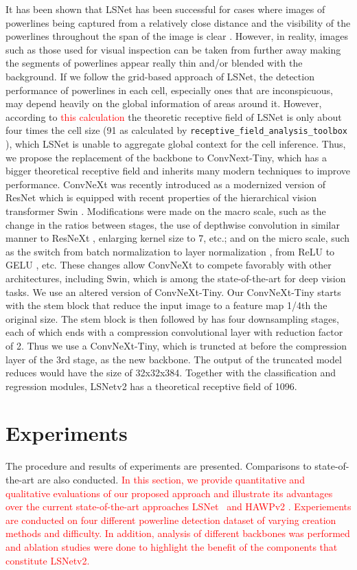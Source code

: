 \documentclass[journal]{IEEEtran}
\begin{document}
It has been shown that LSNet has been successful for cases where images of powerlines being captured from a relatively close distance and the visibility of the powerlines throughout the span of the image is clear \cite{Nguyen2020}. However, in reality, images such as those used for visual inspection can be taken from further away making the segments of powerlines appear really thin and/or blended with the background. If we follow the grid-based approach of LSNet, the detection performance of powerlines in each cell, especially ones that are inconspicuous, may depend heavily on the global information of areas around it. However, according to \textcolor{red}{this calculation} the theoretic receptive field of LSNet is only about four times the cell size (91 as calculated by \texttt{receptive\_field\_analysis\_toolbox} \cite{receptive_field_analysis_toolbox}), which LSNet is unable to aggregate global context for the cell inference. Thus, we propose the replacement of the backbone to ConvNext-Tiny, which has a bigger theoretical receptive field and inherits many modern techniques to improve performance. ConvNeXt was recently introduced as a modernized version of ResNet \cite{resnet} which is equipped with recent properties of the hierarchical vision transformer Swin \cite{swin}. Modifications were made on the macro scale, such as the change in the ratios between stages, the use of depthwise convolution in similar manner to ResNeXt \cite{resnext}, enlarging kernel size to 7, etc.; and on the micro scale, such as the switch from batch normalization \cite{batchnorm} to layer normalization \cite{layernorm}, from ReLU \cite{relu} to GELU \cite{gelu}, etc. These changes allow ConvNeXt to compete favorably with other architectures, including Swin, which is among the state-of-the-art for deep vision tasks. We use an altered version of ConvNeXt-Tiny. Our ConvNeXt-Tiny starts with the stem block that reduce the input image to a feature map 1/4th the original size. The stem block is then followed by has four downsampling stages, each of which ends with a compression convolutional layer with reduction factor of 2. Thus we use a ConvNeXt-Tiny, which is truncted at before the compression layer of the 3rd stage, as the new backbone. The output of the truncated model reduces would have the size of 32x32x384. Together with the classification and regression modules, LSNetv2 has a theoretical receptive field of 1096.



\section{Experiments}
The procedure and results of experiments are presented. Comparisons to state-of-the-art are also conducted.
\textcolor{red}{In this section, we provide quantitative and qualitative evaluations of our proposed approach and illustrate its advantages over the current state-of-the-art approaches LSNet~\cite{Nguyen2020} and HAWPv2 \cite{hawpv2}. Experiements are conducted on four different powerline detection dataset of varying creation methods and difficulty. In addition, analysis of different backbones was performed and ablation studies were done to highlight the benefit of the components that constitute LSNetv2.}
\end{document}
